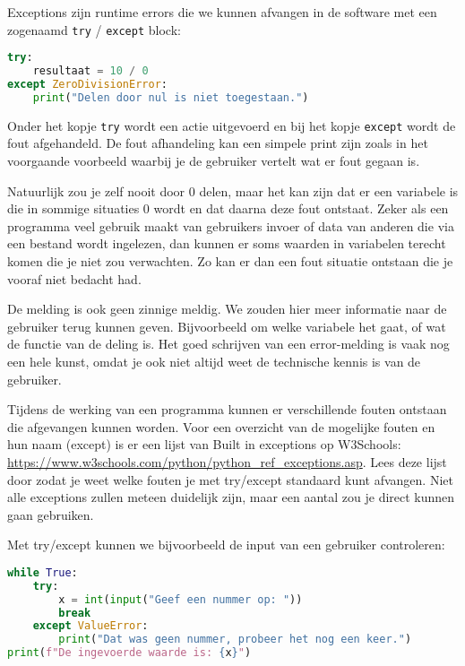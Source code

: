 Exceptions zijn runtime errors die we kunnen afvangen in de software met een zogenaamd \texttt{try} / \texttt{except} block:
\begin{lstlisting}[language=python]
try:
    resultaat = 10 / 0
except ZeroDivisionError:
    print("Delen door nul is niet toegestaan.")
\end{lstlisting}

Onder het kopje \texttt{try} wordt een actie uitgevoerd en bij het kopje \texttt{except} wordt de fout afgehandeld. De fout afhandeling kan een simpele print zijn zoals in het voorgaande voorbeeld waarbij je de gebruiker vertelt wat er fout gegaan is.

Natuurlijk zou je zelf nooit door 0 delen, maar het kan zijn dat er een variabele is die in sommige situaties 0 wordt en dat daarna deze fout ontstaat. Zeker als een programma veel gebruik maakt van gebruikers invoer of data van anderen die via een bestand wordt ingelezen, dan kunnen er soms waarden in variabelen terecht komen die je niet zou verwachten. Zo kan er dan een fout situatie ontstaan die je vooraf niet bedacht had.

De melding  is ook geen zinnige meldig. We zouden hier meer informatie naar de gebruiker terug kunnen geven. Bijvoorbeeld om welke variabele het gaat, of wat de functie van de deling is. Het goed schrijven van een error-melding is vaak nog een hele kunst, omdat je ook niet altijd weet de technische kennis is van de gebruiker.

Tijdens de werking van een programma kunnen er verschillende fouten ontstaan die afgevangen kunnen worden. Voor een overzicht van de mogelijke fouten en hun naam (except) is er een lijst van Built in exceptions op W3Schools: \url{https://www.w3schools.com/python/python_ref_exceptions.asp}. Lees deze lijst door zodat je weet welke fouten je met try/except standaard kunt afvangen. Niet alle exceptions zullen meteen duidelijk zijn, maar een aantal zou je direct kunnen gaan gebruiken.

Met try/except kunnen we bijvoorbeeld de input van een gebruiker controleren:
\begin{lstlisting}[language=python]
while True:
    try:
        x = int(input("Geef een nummer op: "))
        break
    except ValueError:
        print("Dat was geen nummer, probeer het nog een keer.")
print(f"De ingevoerde waarde is: {x}")
\end{lstlisting}

